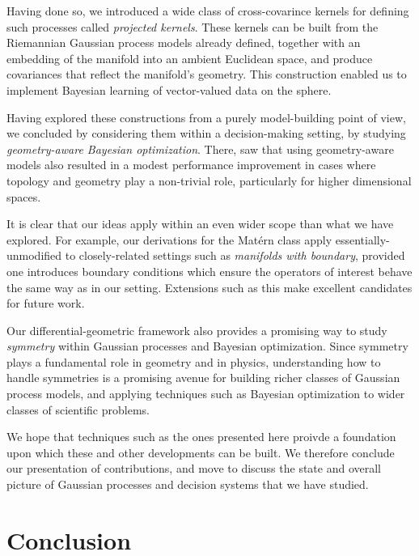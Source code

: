 \documentclass[11pt]{book}
\begin{document}
Having done so, we introduced a wide class of cross-covarince kernels for defining such processes called \emph{projected kernels}.
These kernels can be built from the Riemannian Gaussian process models already defined, together with an embedding of the manifold into an ambient Euclidean space, and produce covariances that reflect the manifold's geometry.
This construction enabled us to implement Bayesian learning of vector-valued data on the sphere.

Having explored these constructions from a purely model-building point of view, we concluded by considering them within a decision-making setting, by studying \emph{geometry-aware Bayesian optimization}.
There, saw that using geometry-aware models also resulted in a modest performance improvement in cases where topology and geometry play a non-trivial role, particularly for higher dimensional spaces.

It is clear that our ideas apply within an even wider scope than what we have explored.
For example, our derivations for the Matérn class apply essentially-unmodified to closely-related settings such as \emph{manifolds with boundary}, provided one introduces boundary conditions which ensure the operators of interest behave the same way as in our setting.
Extensions such as this make excellent candidates for future work.

Our differential-geometric framework also provides a promising way to study \emph{symmetry} within Gaussian processes and Bayesian optimization.
Since symmetry plays a fundamental role in geometry and in physics, understanding how to handle symmetries is a promising avenue for building richer classes of Gaussian process models, and applying techniques such as Bayesian optimization to wider classes of scientific problems.

We hope that techniques such as the ones presented here proivde a foundation upon which these and other developments can be built.
We therefore conclude our presentation of contributions, and move to discuss the state and overall picture of Gaussian processes and decision systems that we have studied.


\chapter{Conclusion}
\label{ch:conclusion}

\printbibliography
\end{document}
